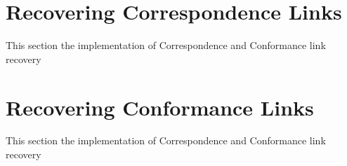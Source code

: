 \section{Recovering Correspondence  Links}
\label{section:RecoveringCorrespondenceLinks}
This section the implementation of \gls{Correspondence} and \gls{Conformance} link recovery

\section{Recovering Conformance Links}
\label{section:RecoveringConformanceLinks}
This section the implementation of \gls{Correspondence} and \gls{Conformance} link recovery